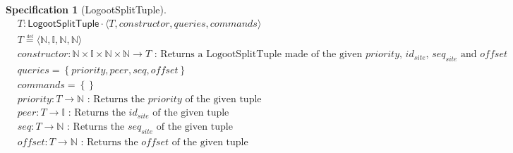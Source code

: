 \documentclass{article}
\newcommand{\commands}[1]{commands = \set{#1}}
\newcommand{\defeq}{\overset{\underset{\mathrm{def}}{}}{=}}
\newcommand{\fnspec}[3]{#1: #2 \text{ : #3}}
\newcommand{\queries}[1]{queries = \set{#1}}
\newcommand{\set}[1]{\left\{#1\right\}} %
\newcommand{\spectuple}[1]{\tuple{#1, constructor, queries, commands}}
\newcommand{\tuple}[1]{\langle #1 \rangle}
\theoremstyle{definition}
\newcounter{note-counter}
\theoremstyle{definition}
\theoremstyle{definition}
\newcounter{specificationcounter}
\theoremstyle{definition}
\newtheorem{specification}[specificationcounter]{Specification}
\begin{document}

\begin{specification}[LogootSplitTuple]
    \begin{align*}
    &T: \mathsf{LogootSplitTuple} \cdot \spectuple{T}\\
    &T \defeq \tuple{\mathbb{N}, \mathbb{I}, \mathbb{N}, \mathbb{N}}\\
    &\fnspec{constructor}{\mathbb{N} \times \mathbb{I} \times \mathbb{N} \times \mathbb{N} \to T}{Returns a LogootSplitTuple made of the given $priority$, $id_{site}$, $seq_{site}$ and $offset$}\\
    &\queries{priority, peer, seq, offset}\\
    &\commands{}\\
    &\fnspec{priority}{T \to \mathbb{N}}{Returns the $priority$ of the given tuple}\\
    &\fnspec{peer}{T \to \mathbb{I}}{Returns the $id_{site}$ of the given tuple}\\
    &\fnspec{seq}{T \to \mathbb{N}}{Returns the $seq_{site}$ of the given tuple}\\
    &\fnspec{offset}{T \to \mathbb{N}}{Returns the $offset$ of the given tuple}
    \end{align*}
    \label{spec:logootsplit-tuple}
\end{specification}
\end{document}
